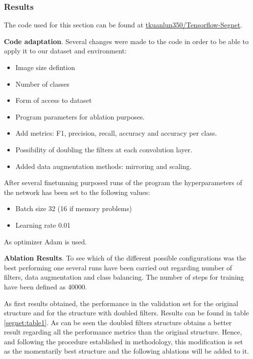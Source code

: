 \documentclass[12pt,a4paper]{article}
\begin{document}
\subsubsection{Results}

The code used for this section can be found at \href{https://github.com/tkuanlun350/Tensorflow-SegNet}{tkuanlun350/Tensorflow-Segnet}.\newline

\textbf{Code adaptation}. Several changes were made to the code in order to be able to apply it to our dataset and environment:

\begin{itemize}
\item Image size defintion
\item Number of classes
\item Form of access to dataset
\item Program parameters for ablation purposes.
\item Add metrics:  F1, precision, recall, accuracy and accuracy per class.
\item Possibility of doubling the filters at each convolution layer.
\item Added data augmentation methods: mirroring and scaling.
\end{itemize}

After several finetunning purposed runs of the program the hyperparameters of the network has been set to the following values:

\begin{itemize}
\item Batch size 32 (16 if memory problems)
\item Learning rate 0.01
\end{itemize}

As optimizer Adam is used.\newline

\textbf{Ablation Results}. To see which of the different possible configurations was the best performing one several runs have been carried out regarding number of filters, data augmentation and class balancing. The number of steps for training have been defined as 40000.\newline

As first results obtained, the performance in the validation set for the original structure and for the structure with doubled filters. Results can be found in table \ref{segnet:table1}. As can be seen the doubled filters structure obtains a better result regarding all the performance metrics than the original structure. Hence, and following the procedure established in methodology, this modification is set as the momentarily best structure and the following ablations will be added to it.\newline
\end{document}

